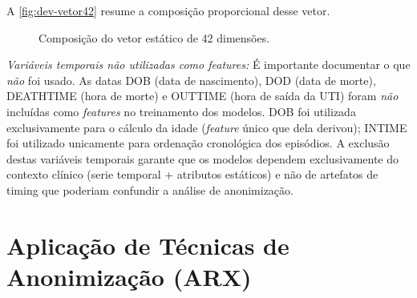 A \autoref{fig:dev-vetor42} resume a composição proporcional desse vetor.

\begin{figure}[H]
\centering
\caption{Composição do vetor estático de 42 dimensões.}
\label{fig:dev-vetor42}
\end{figure}

\textit{Variáveis temporais não utilizadas como \textit{features}:} É importante documentar o que \textit{não} foi usado. As datas DOB (data de nascimento), DOD (data de morte), DEATHTIME (hora de morte) e OUTTIME (hora de saída da UTI) foram \textit{não} incluídas como \textit{features} no treinamento dos modelos. DOB foi utilizada exclusivamente para o cálculo da idade (\textit{feature} único que dela derivou); INTIME foi utilizado unicamente para ordenação cronológica dos episódios. A exclusão destas variáveis temporais garante que os modelos dependem exclusivamente do contexto clínico (serie temporal + atributos estáticos) e não de artefatos de timing que poderiam confundir a análise de anonimização.

\section{Aplicação de Técnicas de Anonimização (ARX)}
\label{sec:dev-anonimizacao}

